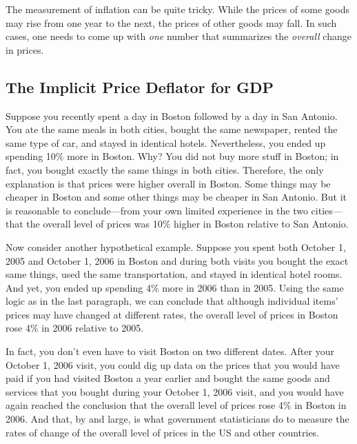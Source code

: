 \documentclass[
  letterpaper,
]{book}
\theoremstyle{plain}
\theoremstyle{remark}
\begin{document}
The measurement of inflation can be quite tricky. While the prices of
some goods may rise from one year to the next, the prices of other goods
may fall. In such cases, one needs to come up with \emph{one} number
that summarizes the \emph{overall} change in prices.

\subsection{The Implicit Price Deflator for GDP}\label{sec-IPDGDP}


Suppose you recently spent a day in Boston followed by a day in San
Antonio. You ate the same meals in both cities, bought the same
newspaper, rented the same type of car, and stayed in identical hotels.
Nevertheless, you ended up spending 10\% more in Boston. Why? You did
not buy more stuff in Boston; in fact, you bought exactly the same
things in both cities. Therefore, the only explanation is that prices
were higher overall in Boston. Some things may be cheaper in Boston and
some other things may be cheaper in San Antonio. But it is reasonable to
conclude---from your own limited experience in the two cities---that the
overall level of prices was 10\% higher in Boston relative to San
Antonio.

Now consider another hypothetical example. Suppose you spent both
October 1, 2005 and October 1, 2006 in Boston and during both visits you
bought the exact same things, used the same transportation, and stayed
in identical hotel rooms. And yet, you ended up spending 4\% more in
2006 than in 2005. Using the same logic as in the last paragraph, we can
conclude that although individual items' prices may have changed at
different rates, the overall level of prices in Boston rose 4\% in 2006
relative to 2005.

In fact, you don't even have to visit Boston on two different dates.
After your October 1, 2006 visit, you could dig up data on the prices
that you would have paid if you had visited Boston a year earlier and
bought the same goods and services that you bought during your October
1, 2006 visit, and you would have again reached the conclusion that the
overall level of prices rose 4\% in Boston in 2006. And that, by and
large, is what government statisticians do to measure the rates of
change of the overall level of prices in the US and other countries.
\end{document}
